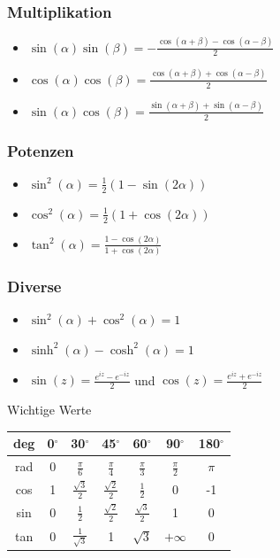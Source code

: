 \documentclass[a4paper,8pt]{extarticle}
\begin{document}
\subsubsection{Multiplikation}
\begin{itemize}
 \item $\sin(\alpha) \sin(\beta) = -\frac{\cos(\alpha + \beta) - \cos(\alpha - \beta)}{2}$
 \item $\cos(\alpha) \cos(\beta) =  \frac{\cos(\alpha + \beta) + \cos(\alpha - \beta)}{2}$
 \item $\sin(\alpha) \cos(\beta) =  \frac{\sin(\alpha + \beta) + \sin(\alpha - \beta)}{2}$
\end{itemize}

\subsubsection{Potenzen}
\begin{itemize}
 \item $\sin^2(\alpha) = \frac{1}{2}(1-\sin(2\alpha))$
 \item $\cos^2(\alpha) = \frac{1}{2}(1+\cos(2\alpha))$
 \item $\tan^2(\alpha) = \frac{1-\cos(2\alpha)}{1+\cos(2\alpha)}$
\end{itemize}

\subsubsection{Diverse}

\begin{itemize}
 \item $\sin^2(\alpha) + \cos^2(\alpha) = 1$
 \item $\sinh^2(\alpha) - \cosh^2(\alpha) = 1$
 \item $\sin(z) = \frac{e^{iz} - e^{-iz}}{2}$ und $\cos(z) = \frac{e^{iz} + e^{-iz}}{2}$
\end{itemize}


\begin{mainbox}{Wichtige Werte}
\begin{center} 
 \begin{tabular}{c|cccccc}
  deg & 0$^{\circ}$  & 30$^{\circ}$  & 45$^{\circ}$  & 60$^{\circ}$  & 90$^{\circ}$  & 180$^{\circ}$  \\
  \midrule
  rad & 0 & $\frac{\pi}{6}$ & $\frac{\pi}{4}$ & $\frac{\pi}{3}$ & $\frac{\pi}{2}$ & $\pi$ \\
  cos & 1 & $\frac{\sqrt{3}}{2}$ & $\frac{\sqrt{2}}{2}$ & $\frac{1}{2}$ & 0 & -1 \\
  sin & 0 & $\frac{1}{2}$ & $\frac{\sqrt{2}}{2}$ & $\frac{\sqrt{3}}{2}$ & 1 & 0 \\
  tan & 0 & $\frac{1}{\sqrt{3}}$ & 1 & $\sqrt{3}$ & $+\infty$ & 0 \\
 \end{tabular}
\end{center}
\end{mainbox}
\end{document}
